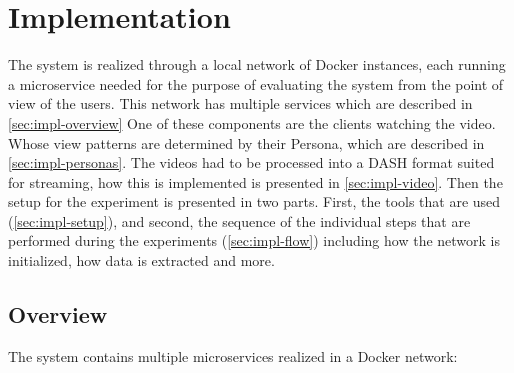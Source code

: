 \chapter{Implementation}
\label{cha:implementation}

The system is realized through a local network of Docker instances, each running a microservice needed for the purpose of evaluating the system from the point of view of the users. This network has multiple services which are described in \autoref{sec:impl-overview}
One of these components are the clients watching the video. Whose view patterns are determined by their Persona, which are described in \autoref{sec:impl-personas}.
The videos had to be processed into a \ac{DASH} format suited for streaming, how this is implemented is presented in \autoref{sec:impl-video}.
Then the setup for the experiment is presented in two parts. First, the tools that are used (\autoref{sec:impl-setup}), and second, the sequence of the individual steps that are performed during the experiments (\autoref{sec:impl-flow}) including how the network is initialized, how data is extracted and more.

\section{Overview}
\label{sec:impl-overview}
The system  contains multiple microservices realized in a Docker network:

